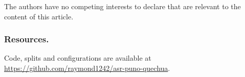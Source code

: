 \documentclass[runningheads]{llncs}
\begin{document}









\begin{credits}
\subsubsection{\discintname}
The authors have no competing interests to declare that are relevant to the
content of this article.
\end{credits}

\subsubsection{Resources.} Code, splits and configurations are available at
\url{https://github.com/raymond1242/asr-puno-quechua}.



\end{document}

